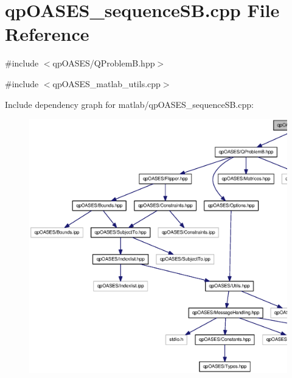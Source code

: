\section{qpOASES\_\-sequenceSB.cpp File Reference}
\label{matlab_2qpOASES__sequenceSB_8cpp}
{\ttfamily \#include $<$qpOASES/QProblemB.hpp$>$}\par
{\ttfamily \#include $<$qpOASES\_\-matlab\_\-utils.cpp$>$}\par
Include dependency graph for matlab/qpOASES\_\-sequenceSB.cpp:
\nopagebreak
\begin{figure}[H]
\begin{center}
\leavevmode
\includegraphics[width=400pt]{matlab_2qpOASES__sequenceSB_8cpp__incl}
\end{center}
\end{figure}
